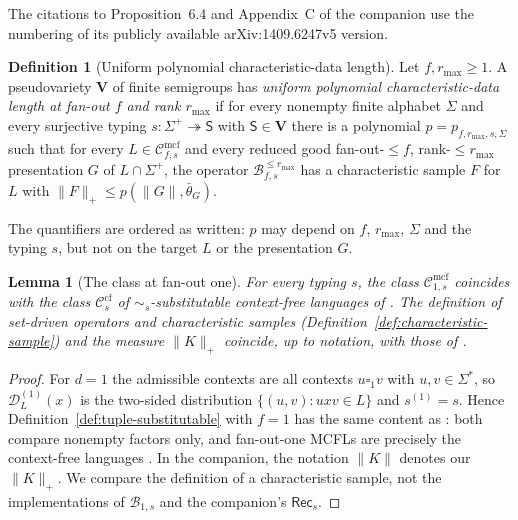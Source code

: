\documentclass[11pt]{article}
\numberwithin{equation}{section}
\theoremstyle{plain}
\newtheorem{lemma}[theorem]{Lemma}
\theoremstyle{definition}
\newtheorem{definition}[theorem]{Definition}
\theoremstyle{remark}
\newcommand{\Cmcf}[2]{\mathcal{C}^{\mathrm{mcf}}_{#1,#2}}
\newcommand{\D}{\mathcal{D}}
\newcommand{\blank}{\square}
\theoremstyle{plain}
\begin{document}
The citations to Proposition~6.4 and Appendix~C of the companion use
the numbering of its publicly available arXiv:1409.6247v5 version.

\begin{definition}[Uniform polynomial characteristic-data length]
\label{def:uniform-polydata}
Let $f,r_{\max}\ge1$.  A pseudovariety $\mathbf V$ of finite semigroups
has \emph{uniform polynomial characteristic-data length at fan-out $f$ and
rank $r_{\max}$} if for every nonempty finite alphabet $\Sigma$ and every
surjective typing $s:\Sigma^+\twoheadrightarrow\mathsf S$ with
$\mathsf S\in\mathbf V$ there is a polynomial $p=p_{f,r_{\max},s,\Sigma}$
such that for every $L\in\Cmcf{f}{s}$ and every reduced good
fan-out-$\le f$, rank-$\le r_{\max}$ presentation $G$ of $L\cap\Sigma^+$,
the operator $\mathcal B^{\le r_{\max}}_{f,s}$ has a characteristic sample
$F$ for $L$ with $\|F\|_+\le p(\|G\|,\bar\theta_G)$.
\end{definition}

The quantifiers are ordered as written: $p$ may depend on $f$,
$r_{\max}$, $\Sigma$ and the typing $s$, but not on the target $L$ or the
presentation $G$.

\begin{lemma}[The class at fan-out one]
\label{lem:fanout-one-classes}
For every typing $s$, the class $\Cmcf{1}{s}$ coincides with the class
$\mathcal C^{\mathrm{cf}}_s$ of $\sim_s$-substitutable context-free
languages of \cite[Definition~2.1 and Section~3]{kuriyamaCFG}.
The definition of set-driven operators and characteristic samples
(Definition~\ref{def:characteristic-sample}) and the measure $\|K\|_+$
coincide, up to notation, with those of \cite[Section~2]{kuriyamaCFG}.
\end{lemma}

\begin{proof}
For $d=1$ the admissible contexts are all contexts
$u\blank_1v$ with $u,v\in\Sigma^*$, so $\D^{(1)}_L(x)$ is the two-sided
distribution $\{(u,v):uxv\in L\}$ and $s^{(1)}=s$.  Hence Definition~\ref{def:tuple-substitutable} with $f=1$ has the
same content as \cite[Definition~2.1]{kuriyamaCFG}: both compare
nonempty factors only, and fan-out-one MCFLs are precisely the
context-free languages \cite{SekiEtAl1991}.  In the companion,
the notation $\|K\|$ denotes our $\|K\|_+$.
We compare the definition of a characteristic sample, not the
implementations of $\mathcal B_{1,s}$ and the companion's
$\mathsf{Rec}_s$.
\end{proof}
\end{document}
